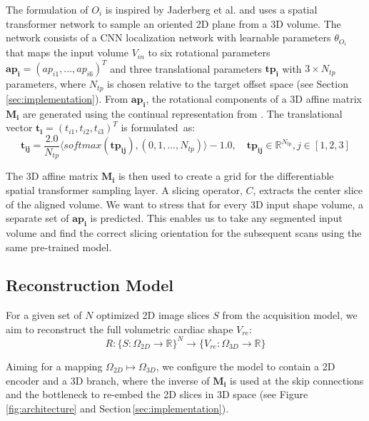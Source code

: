     The formulation of $O_i$ is inspired by Jaderberg et al. \citep{jaderberg2015spatial} and uses a spatial transformer network to sample an oriented 2D plane from a 3D volume.
    The network consists of a CNN localization network with learnable parameters $\theta_{O_i}$ that maps the input volume $V_{in}$ to six rotational parameters $\mathbf{ap_i}=\left(ap_{i1}, \dots, ap_{i6}\right)^T$ and three translational parameters  $\mathbf{tp_i}$ with $3 \times N_{tp}$ parameters, where $N_{tp}$ is chosen relative to the target offset space (see Section\,\ref{sec:implementation}). From $\mathbf{ap_i}$, the rotational components of a 3D affine matrix $\mathbf{M_i}$ are generated using the continual representation from \citep{zhou2019continuity}. The translational vector $\mathbf{t_i}=\left(t_{i1}, t_{i2}, t_{i3}\right)^T$ is formulated~as:
    \begin{equation}
        \mathbf{t_{ij}} = \frac{2.0}{N_{tp}}\langle softmax\left(\mathbf{tp_{ij}}\right), \left(0,1,\dots,N_{tp}\right)\rangle -1.0, \quad \mathbf{tp_{ij}} \in \mathbb{R}^{N_{tp}}\label{eq:translation}, j \in \left[1,2,3\right]
    \end{equation}

    The 3D affine matrix $\mathbf{M_i}$ is then used to create a grid for the differentiable spatial transformer sampling layer. A slicing operator, $C$, extracts the center slice of the aligned volume. We want to stress that for every 3D input shape volume, a separate set of $\mathbf{ap_i}$ is predicted. This enables us to take any segmented input volume and find the correct slicing orientation for the subsequent scans using the same pre-trained model.  %

    \subsection{Reconstruction Model}
    \label{sec:method_reconstruction_model}
     For a given set of $N$ optimized 2D image slices $S$ from the acquisition model, we aim to reconstruct the full volumetric cardiac shape $V_{re}$:
    \begin{equation}
        R: \{ S:\Omega_{2D} \rightarrow \mathbb{R}\}^N \rightarrow \{V_{re}:\Omega_{3D} \rightarrow \mathbb{R}\} \label{eq:reconstruction}
    \end{equation}

    Aiming for a mapping $\Omega_{2D} \mapsto \Omega_{3D}$, we configure the model to contain a 2D encoder and a 3D branch, where the inverse of $\mathbf{M_i}$ is used at the skip connections and the bottleneck to re-embed the 2D slices in 3D space (see Figure\,\ref{fig:architecture} and Section\,\ref{sec:implementation}).

